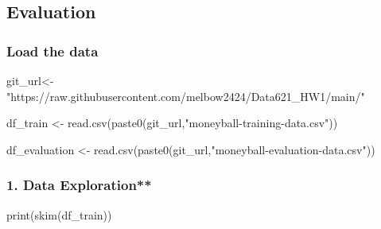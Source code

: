 \documentclass[
]{article}
\newenvironment{Shaded}{\begin{snugshade}}{\end{snugshade}}
\newcommand{\FunctionTok}[1]{\textcolor[rgb]{0.00,0.00,0.00}{#1}}
\newcommand{\NormalTok}[1]{#1}
\newcommand{\OtherTok}[1]{\textcolor[rgb]{0.56,0.35,0.01}{#1}}
\newcommand{\StringTok}[1]{\textcolor[rgb]{0.31,0.60,0.02}{#1}}
\begin{document}
\newpage

\hypertarget{evaluation}{%
\subsection{\texorpdfstring{\textbf{Evaluation}}{Evaluation}}\label{evaluation}}

\hypertarget{load-the-data}{%
\subsubsection{\texorpdfstring{\textbf{Load the
data}}{Load the data}}\label{load-the-data}}

\begin{Shaded}
\begin{Highlighting}[]
\NormalTok{git\_url}\OtherTok{\textless{}{-}}
  \StringTok{"https://raw.githubusercontent.com/melbow2424/Data621\_HW1/main/"}

\NormalTok{df\_train }\OtherTok{\textless{}{-}} 
  \FunctionTok{read.csv}\NormalTok{(}\FunctionTok{paste0}\NormalTok{(git\_url,}\StringTok{"moneyball{-}training{-}data.csv"}\NormalTok{))}

\NormalTok{df\_evaluation }\OtherTok{\textless{}{-}} 
  \FunctionTok{read.csv}\NormalTok{(}\FunctionTok{paste0}\NormalTok{(git\_url,}\StringTok{"moneyball{-}evaluation{-}data.csv"}\NormalTok{))}
\end{Highlighting}
\end{Shaded}

\hypertarget{data-exploration}{%
\subsubsection{1. Data Exploration**}\label{data-exploration}}

\begin{Shaded}
\begin{Highlighting}[]
\FunctionTok{print}\NormalTok{(}\FunctionTok{skim}\NormalTok{(df\_train))}
\end{Highlighting}
\end{Shaded}
\end{document}
